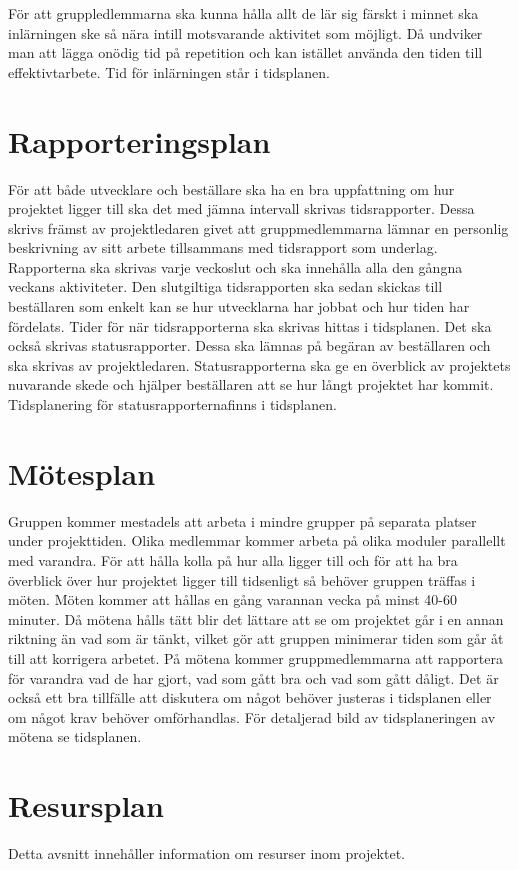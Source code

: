 \documentclass[projektplan/plan.tex]{subfiles}
\begin{document}
För att gruppledlemmarna ska kunna hålla allt de lär sig färskt i minnet ska inlärningen ske så nära intill motsvarande aktivitet som möjligt. Då undviker man att lägga onödig tid på repetition och kan istället använda den tiden till effektivtarbete. Tid för inlärningen står i tidsplanen.

\section{Rapporteringsplan}
För att både utvecklare och beställare ska ha en bra uppfattning om hur projektet ligger till ska det med jämna intervall skrivas tidsrapporter. Dessa skrivs främst av projektledaren givet att gruppmedlemmarna lämnar en personlig beskrivning av sitt arbete tillsammans med tidsrapport som underlag. Rapporterna ska skrivas varje veckoslut och ska innehålla alla den gångna veckans aktiviteter. Den slutgiltiga tidsrapporten ska sedan skickas till beställaren som enkelt kan se hur utvecklarna har jobbat och hur tiden har fördelats. Tider för när tidsrapporterna ska skrivas hittas i tidsplanen.
Det ska också skrivas statusrapporter. Dessa ska lämnas på begäran av beställaren och ska skrivas av projektledaren. Statusrapporterna ska ge en överblick av projektets nuvarande skede och hjälper beställaren att se hur långt projektet har kommit. Tidsplanering för statusrapporternafinns i tidsplanen.
\section{Mötesplan}
Gruppen kommer mestadels att arbeta i mindre grupper på separata platser under projekttiden. Olika medlemmar kommer arbeta på olika moduler parallellt med varandra. För att hålla kolla på hur alla ligger till och för att ha bra överblick över hur projektet ligger till tidsenligt så behöver gruppen träffas i möten. Möten kommer att hållas en gång varannan vecka på minst 40-60 minuter. Då mötena hålls tätt blir det lättare att se om projektet går i en annan riktning än vad som är tänkt, vilket gör att gruppen minimerar tiden som går åt till att korrigera arbetet. På mötena kommer gruppmedlemmarna att rapportera för varandra vad de har gjort, vad som gått bra och vad som gått dåligt. Det är också ett bra tillfälle att diskutera om något behöver justeras i tidsplanen eller om något krav behöver omförhandlas. För detaljerad bild av tidsplaneringen av mötena se tidsplanen.
\section{Resursplan}
Detta avsnitt innehåller information om resurser inom projektet.
\end{document}
